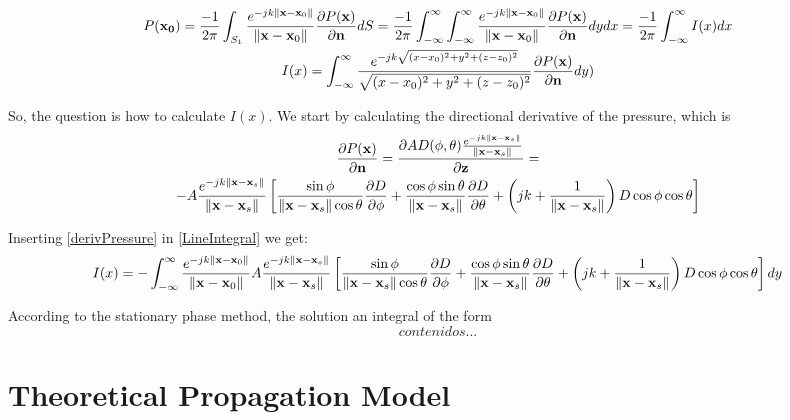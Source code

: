 \begin{gather}
P(\mathbf{x_0}) = \frac{-1}{2\pi} \int_{S_1} \frac{e^{-jk\left\| \mathbf{x} - \mathbf{x}_0 \right\|}}{\left\| \mathbf{x} - \mathbf{x}_0 \right\|} \frac{\partial P(\mathbf{x})}{\partial \mathbf{n}} dS = \frac{-1}{2\pi} \int_{-\infty}^{\infty} \int_{-\infty}^{\infty} \frac{e^{-jk\left\| \mathbf{x} - \mathbf{x}_0 \right\|}}{\left\| \mathbf{x} - \mathbf{x}_0 \right\|} \frac{\partial P(\mathbf{x})}{\partial \mathbf{n}} dy dx = \frac{-1}{2\pi} \int_{-\infty}^{\infty} I(x) dx \\
I(x) = \int_{-\infty}^{\infty} \frac{e^{-jk\sqrt{(x - x_0)^2 + y^2 + (z-z_0)^2}}}{\sqrt{(x - x_0)^2 + y^2 + (z-z_0)^2}} \frac{\partial P(\mathbf{x})}{\partial \mathbf{n}} dy
\label{LineIntegral})
\end{gather}

So, the question is how to calculate $I(x)$. We start by calculating the directional derivative of the pressure, which is \cite{Verheijen}
\begin{multline}
\frac{\partial P(\vec{x})}{\partial \mathbf{n}} = \frac{\partial \coef \Diag(\phi, \theta) \GreenFunc[\vec{x} - \vec{x}_s]}{\partial \mathbf{z}} = \\ -A \GreenFunc[\vec{x} - \vec{x}_s] \left[ \frac{\sin\phi}{\norm{\vec{x} - \vec{x}_s}\cos\theta}\frac{\partial\Diag}{\partial\phi} + \frac{\cos\phi \sin\theta}{\norm{\vec{x} - \vec{x}_s}} \frac{\partial\Diag}{\partial\theta} + \left(jk + \frac{1}{\norm{\vec{x} - \vec{x}_s}}\right) \Diag \cos\phi \cos\theta \right]
\label{derivPressure}
\end{multline}

Inserting \autoref{derivPressure} in \autoref{LineIntegral} we get:
\begin{equation}
I(x) = -\int_{-\infty}^{\infty} \GreenFunc[\vec{x} - \vec{x}_0] A \GreenFunc[\vec{x} - \vec{x}_s] \left[ \frac{\sin\phi}{\norm{\vec{x} - \vec{x}_s}\cos\theta}\frac{\partial\Diag}{\partial\phi} + \frac{\cos\phi \sin\theta}{\norm{\vec{x} - \vec{x}_s}} \frac{\partial\Diag}{\partial\theta} + \left(jk + \frac{1}{\norm{\vec{x} - \vec{x}_s}}\right) \Diag \cos\phi \cos\theta \right] dy
\end{equation}

According to the stationary phase method, the solution an integral of the form
\begin{equation}
contenidos...
\end{equation}

\section{Theoretical Propagation Model}
\label{TheoreticalModelLabel}

